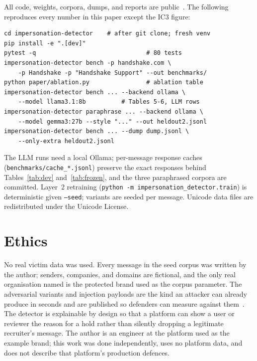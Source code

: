 \documentclass[10pt,twocolumn]{article}
\newcommand{\code}[1]{\texttt{#1}}
\begin{document}
All code, weights, corpora, dumps, and reports are public~\cite{ezema2026detector}. The following reproduces every number in this paper except the IC3 figure:
{\footnotesize\begin{verbatim}
cd impersonation-detector    # after git clone; fresh venv
pip install -e ".[dev]"
pytest -q                               # 80 tests
impersonation-detector bench -p handshake.com \
    -p Handshake -p "Handshake Support" --out benchmarks/
python paper/ablation.py                # ablation table
impersonation-detector bench ... --backend ollama \
    --model llama3.1:8b          # Tables 5-6, LLM rows
impersonation-detector paraphrase ... --backend ollama \
    --model gemma3:27b --style "..." --out heldout2.jsonl
impersonation-detector bench ... --dump dump.jsonl \
    --only-extra heldout2.jsonl
\end{verbatim}}
The LLM runs need a local Ollama; per-message response caches (\code{benchmarks/cache\_*.jsonl}) preserve the exact responses behind Tables~\ref{tab:dev} and~\ref{tab:frozen}, and the three paraphrased corpora are committed. Layer~2 retraining (\code{python -m impersonation\_detector.train}) is deterministic given \code{--seed}; variants are seeded per message. Unicode data files are redistributed under the Unicode License.

\section{Ethics}
\label{sec:ethics}

No real victim data was used. Every message in the seed corpus was written by the author; senders, companies, and domains are fictional, and the only real organisation named is the protected brand used as the corpus parameter. The adversarial variants and injection payloads are the kind an attacker can already produce in seconds and are published so defenders can measure against them~\cite{yang2025fraudr1,pajola2025ephishgen}. The detector is explainable by design so that a platform can show a user or reviewer the reason for a hold rather than silently dropping a legitimate recruiter's message. The author is an engineer at the platform used as the example brand; this work was done independently, uses no platform data, and does not describe that platform's production defences.

{\footnotesize\setlength{\bibsep}{2.5pt}

}
\end{document}

